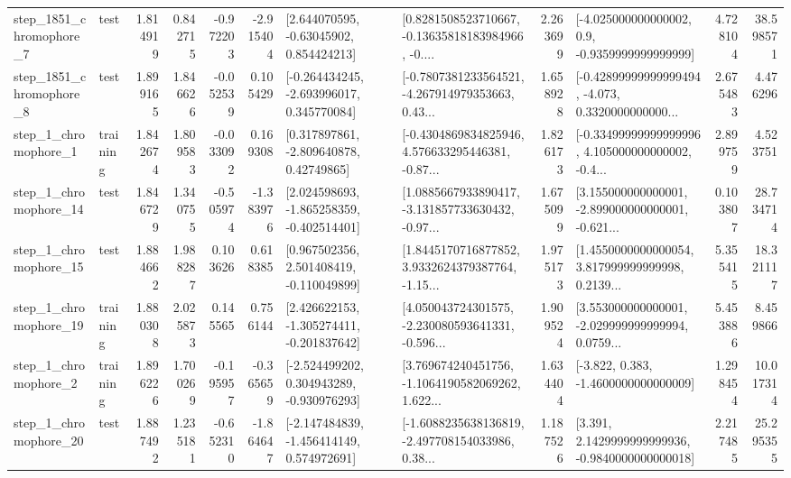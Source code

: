 \begin{tabular}{llrrrrllrlrr}
  step\_1851\_chromophore\_7 &      test &      1.814919 &    0.842715 &     -0.972203 & -2.915404 &     [2.644070595, -0.63045902, 0.854424213] &  [0.8281508523710667, -0.13635818183984966, -0.... &       2.263699 &     [-4.025000000000002, 0.9, -0.9359999999999999] &            4.728104 &         38.598571 \\
  step\_1851\_chromophore\_8 &      test &      1.899165 &    1.846626 &     -0.052539 &  0.105429 &   [-0.264434245, -2.693996017, 0.345770084] &  [-0.7807381233564521, -4.267914979353663, 0.43... &       1.658928 &  [-0.42899999999999494, -4.073, 0.3320000000000... &            2.675483 &          4.476296 \\
     step\_1\_chromophore\_1 &  training &      1.842674 &    1.809583 &     -0.033092 &  0.169308 &     [0.317897861, -2.809640878, 0.42749865] &  [-0.4304869834825946, 4.576633295446381, -0.87... &       1.826173 &  [-0.33499999999999996, 4.105000000000002, -0.4... &            2.899759 &          4.523751 \\
    step\_1\_chromophore\_14 &      test &      1.846729 &    1.340755 &     -0.505974 & -1.383976 &   [2.024598693, -1.865258359, -0.402514401] &  [1.0885667933890417, -3.131857733630432, -0.97... &       1.675099 &  [3.155000000000001, -2.899000000000001, -0.621... &            0.103807 &         28.734714 \\
    step\_1\_chromophore\_15 &      test &      1.884662 &    1.988287 &      0.103626 &  0.618385 &    [0.967502356, 2.501408419, -0.110049899] &  [1.8445170716877852, 3.9332624379387764, -1.15... &       1.975173 &  [1.4550000000000054, 3.817999999999998, 0.2139... &            5.355415 &         18.321117 \\
    step\_1\_chromophore\_19 &  training &      1.880308 &    2.025873 &      0.145565 &  0.756144 &   [2.426622153, -1.305274411, -0.201837642] &  [4.050043724301575, -2.230080593641331, -0.596... &       1.909524 &  [3.553000000000001, -2.029999999999994, 0.0759... &            5.453886 &          8.459866 \\
     step\_1\_chromophore\_2 &  training &      1.896226 &    1.700269 &     -0.195957 & -0.365659 &   [-2.524499202, 0.304943289, -0.930976293] &  [3.769674240451756, -1.1064190582069262, 1.622... &       1.634404 &               [-3.822, 0.383, -1.4600000000000009] &            1.298454 &         10.017314 \\
    step\_1\_chromophore\_20 &      test &      1.887492 &    1.235181 &     -0.652310 & -1.864647 &   [-2.147484839, -1.456414149, 0.574972691] &  [-1.6088235638136819, -2.497708154033986, 0.38... &       1.187526 &   [3.391, 2.1429999999999936, -0.9840000000000018] &            2.217485 &         25.295355 \\

\end{tabular}
